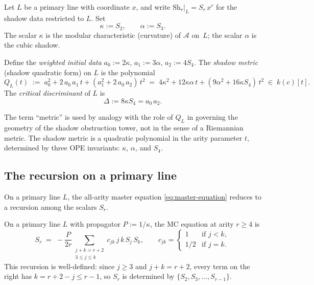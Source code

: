 Let $L$ be a primary line with coordinate $x$, and write
$\mathrm{Sh}_r|_L = S_r \, x^r$ for the shadow data restricted
to $L$. Set
\[
 \kappa := S_2, \qquad \alpha := S_3.
\]
The scalar $\kappa$ is the modular characteristic (curvature)
of $\mathcal{A}$ on~$L$; the scalar $\alpha$ is the cubic shadow.

\begin{definition}
\label{def:shadow-metric-paper}
Define the \emph{weighted initial data}
$a_0 := 2\kappa$, $a_1 := 3\alpha$, $a_2 := 4S_4$.
The \emph{shadow metric} (shadow quadratic form) on $L$ is the
polynomial
\begin{equation}
\label{eq:shadow-metric}
 Q_L(t)
 \;:=\;
 a_0^2 + 2\,a_0\,a_1\,t + (a_1^2 + 2\,a_0\,a_2)\,t^2
 \;=\;
 4\kappa^2 + 12\kappa\alpha\,t + (9\alpha^2 + 16\kappa S_4)\,t^2
 \;\in\; k(c)[t].
\end{equation}
The \emph{critical discriminant} of $L$ is
\begin{equation}
\label{eq:critical-discriminant}
 \Delta := 8\kappa S_4 = a_0 \, a_2.
\end{equation}
\end{definition}

\begin{remark}
The term ``metric'' is used by analogy with the role of $Q_L$
in governing the geometry of the shadow obstruction tower, not in the sense
of a Riemannian metric. The shadow metric is a quadratic
polynomial in the arity parameter $t$, determined by three OPE
invariants: $\kappa$, $\alpha$, and $S_4$.
\end{remark}

\subsection{The recursion on a primary line}

On a primary line $L$, the all-arity master equation
\eqref{eq:master-equation} reduces to a recursion among the scalars
$S_r$.

\begin{proposition}
\label{prop:single-line-recursion}
On a primary line $L$ with propagator $P := 1/\kappa$,
the MC equation at arity $r \geq 4$ is
\begin{equation}
\label{eq:single-line-recursion}
 S_r
 \;=\;
 -\frac{P}{2r}
 \sum_{\substack{j + k = r + 2 \\ 3 \leq j \leq k}}
 c_{jk}\, j\, k\, S_j \, S_k,
 \qquad
 c_{jk} =
 \begin{cases}
 1 & \text{if } j < k, \\
 1/2 & \text{if } j = k.
 \end{cases}
\end{equation}
This recursion is well-defined: since $j \geq 3$ and $j + k = r + 2$,
every term on the right has $k = r + 2 - j \leq r - 1$, so $S_r$
is determined by $\{S_2, S_3, \ldots, S_{r-1}\}$.
\end{proposition}

